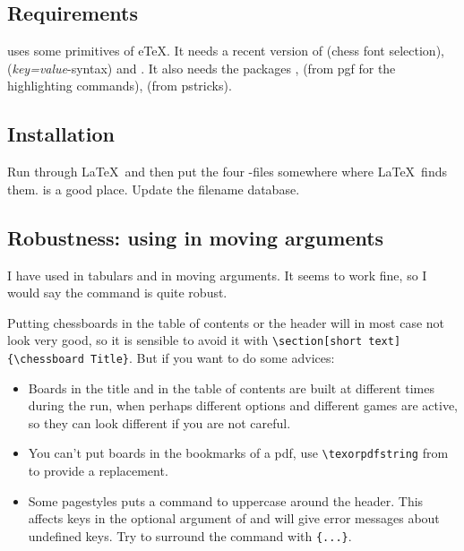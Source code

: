 \documentclass[pagesize,parskip=half-,fontsize=12pt]{scrartcl}
\begin{document}
\subsection{Requirements}

\Pchessboard uses some primitives of e\TeX. It needs a recent version
of \chessfss (chess font selection), 
(\textit{key=value}-syntax) and . It also needs
the packages ,  (from
pgf for the highlighting commands),  (from
pstricks).


\subsection{Installation}
Run  through \LaTeX\ and then put the four
-files somewhere where \LaTeX\ finds them.
 is a good place. Update the
filename database.

\subsection{Robustness: using \texorpdfstring{}{\textbackslash chessboard} in moving arguments}
I have used  in tabulars and in moving arguments. It
seems to work fine, so I would say the command is quite robust.

Putting chessboards in the table of contents or the header will in
most case not look very good, so it is sensible to avoid it with
\lstinline+\section[short text]{\chessboard Title}+.
But if you want to do some advices:
\begin{itemize}
\item
Boards in the title and in the table of contents are built at different times during the run, when perhaps
different options and different games are active, so they can look
different if you are not careful.
\item You can't put boards in the bookmarks of a pdf, use
\verb+\texorpdfstring+ from  to provide a
replacement.
\item Some pagestyles puts a command to uppercase around the header.
This affects keys in the optional argument of  and
will give error messages about undefined keys. Try to surround the
 command with \verb+{...}+.
\end{itemize}
\end{document}
